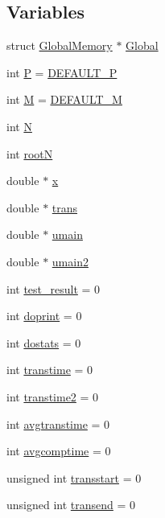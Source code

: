 \subsection*{Variables}
\begin{DoxyCompactItemize}
\item 
struct \hyperlink{structGlobalMemory}{Global\+Memory} $\ast$ \hyperlink{fft_8C_a6aa784faee19c1ec7661ca843bf221d7}{Global}
\item 
int \hyperlink{fft_8C_aef94be98e2c9e4a4dece75f60ca9792c}{P} = \hyperlink{fft_8C_a5ef8f72e91130f2eaa3a1308437323c3}{D\+E\+F\+A\+U\+L\+T\+\_\+\+P}
\item 
int \hyperlink{fft_8C_a5e78dbd5fd0fc01ba7b98dd15e27221e}{M} = \hyperlink{fft_8C_a383f5d92772af0967bbc18d6cac778a2}{D\+E\+F\+A\+U\+L\+T\+\_\+\+M}
\item 
int \hyperlink{fft_8C_a7722c8ecbb62d99aee7ce68b1752f337}{N}
\item 
int \hyperlink{fft_8C_a54af42a3fc75a72bd07ecc71cee6f5ba}{root\+N}
\item 
double $\ast$ \hyperlink{fft_8C_a711aad4cbe735871dd9e91ab575c878b}{x}
\item 
double $\ast$ \hyperlink{fft_8C_a261dc6445544ab3a09e5f50b961887b5}{trans}
\item 
double $\ast$ \hyperlink{fft_8C_a482db91d0d238ae4374a2d566ba79efd}{umain}
\item 
double $\ast$ \hyperlink{fft_8C_ab23232b0d8220f4be701c661c8e8aba7}{umain2}
\item 
int \hyperlink{fft_8C_a6af31710995648af3fe9c60fbacfd9b0}{test\+\_\+result} = 0
\item 
int \hyperlink{fft_8C_a62e849270b0e8c1e2378a94a87858e8b}{doprint} = 0
\item 
int \hyperlink{fft_8C_a415f5ce7ea6e1d5f691e8c4d5b2a169f}{dostats} = 0
\item 
int \hyperlink{fft_8C_ac5065349699afaaa137bb3d5176f65a7}{transtime} = 0
\item 
int \hyperlink{fft_8C_ab151086fbe0d880116adb5d5891c6530}{transtime2} = 0
\item 
int \hyperlink{fft_8C_a88a788d7069c5e81d258f34b79a911ef}{avgtranstime} = 0
\item 
int \hyperlink{fft_8C_a65be02baa5bf3f64dc8057a783d6e4c0}{avgcomptime} = 0
\item 
unsigned int \hyperlink{fft_8C_a4b0e5ae3035174e848f5e52f5fd9506f}{transstart} = 0
\item 
unsigned int \hyperlink{fft_8C_a02ddcff0fa450bbe96472988730051ef}{transend} = 0

\end{DoxyCompactItemize}
